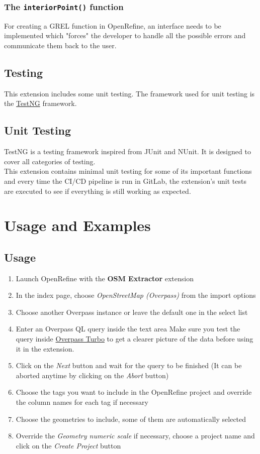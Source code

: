 \subsubsection{The \texttt{interiorPoint()} function} 
For creating a GREL function in OpenRefine, an interface needs to be implemented which "forces" the developer to handle all the possible errors and communicate them back to the user. 
\subsection{Testing}
This extension includes some unit testing. The framework used for unit testing is the \href{https://testng.org/}{TestNG} framework.
\subsection{Unit Testing}
TestNG is a testing framework inspired from JUnit and NUnit. It is designed to cover all categories of testing.\\
\newline
This extension contains minimal unit testing for some of its important functions and every time the CI/CD pipeline is run in GitLab, the
extension's unit tests are executed to see if everything is still working as expected.
\pagebreak
\section{Usage and Examples}
\subsection{Usage}
\begin{enumerate}
    \item Launch OpenRefine with the \textbf{OSM Extractor} extension
    \item In the index page, choose \textit{OpenStreetMap (Overpass)} from the import options
    \item Choose another Overpass instance or leave the default one in the select list
    \item Enter an Overpass QL query inside the text area
        \subitem Make sure you test the query inside \href{https://overpass-turbo.eu/}{Overpass Turbo} to get a clearer
        picture of the data before using it in the extension.
    \item Click on the \textit{Next} button and wait for the query to be finished (It can be aborted anytime by clicking on the \textit{Abort} button)
    \item Choose the tags you want to include in the OpenRefine project and override the column names for each tag if necessary
    \item Choose the geometries to include, some of them are automatically selected
    \item Override the \textit{Geometry numeric scale} if necessary, choose a project name and click on the \textit{Create Project} button
\end{enumerate}
